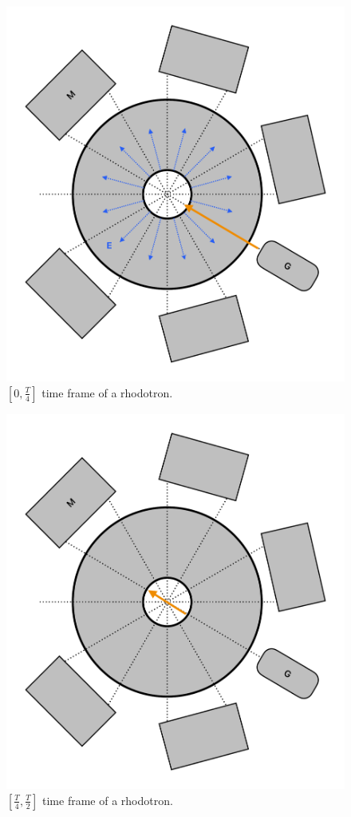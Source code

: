 \documentclass{article}
\begin{document}
\begin{figure}[H]
    \centering
    \includegraphics[width=\textwidth]{../../../figures/illustrations/rhod1.pdf}
    \caption{$[0, \frac{T}{4}]$ time frame of a rhodotron.}
    \label{fig:rhod_cycle_1}
\end{figure}
\begin{figure}[H]
    \centering
    \includegraphics[width=\textwidth]{../../../figures/illustrations/rhod2.pdf}
    \caption{$[\frac{T}{4}, \frac{T}{2}]$ time frame of a rhodotron.}
    \label{fig:rhod_cycle_2}
\end{figure}
\end{document}
